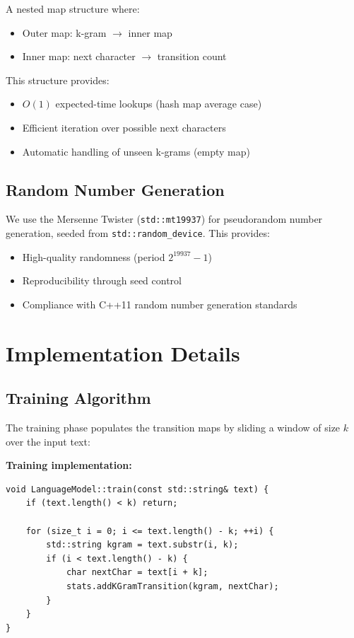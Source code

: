 \documentclass[11pt,letterpaper]{article}
\begin{document}
A nested map structure where:
\begin{itemize}
    \item Outer map: k-gram $\to$ inner map
    \item Inner map: next character $\to$ transition count
\end{itemize}

This structure provides:
\begin{itemize}
    \item $O(1)$ expected-time lookups (hash map average case)
    \item Efficient iteration over possible next characters
    \item Automatic handling of unseen k-grams (empty map)
\end{itemize}

\subsection{Random Number Generation}

We use the Mersenne Twister (\texttt{std::mt19937}) for pseudorandom number generation, seeded from \texttt{std::random\_device}. This provides:
\begin{itemize}
    \item High-quality randomness (period $2^{19937}-1$)
    \item Reproducibility through seed control
    \item Compliance with C++11 random number generation standards
\end{itemize}

\section{Implementation Details}\label{sec:implementation}

\subsection{Training Algorithm}

The training phase populates the transition maps by sliding a window of size $k$ over the input text:

\textbf{Training implementation:}
\begin{verbatim}
void LanguageModel::train(const std::string& text) {
    if (text.length() < k) return;
    
    for (size_t i = 0; i <= text.length() - k; ++i) {
        std::string kgram = text.substr(i, k);
        if (i < text.length() - k) {
            char nextChar = text[i + k];
            stats.addKGramTransition(kgram, nextChar);
        }
    }
}
\end{verbatim}
\end{document}
